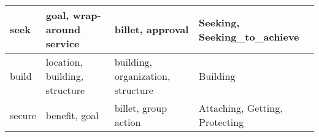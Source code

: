 \begin{table*}[th]
\begin{tabular}{|l|l|l|l|}
seek&goal, wrap-around service&billet, approval&Seeking, Seeking\_to\_achieve\\ \hline
build&location, building, structure&building, organization, structure&Building\\ \hline
secure&benefit, goal&billet, group action&Attaching, Getting, Protecting\\ \hline

\end{tabular}
\end{table*}
